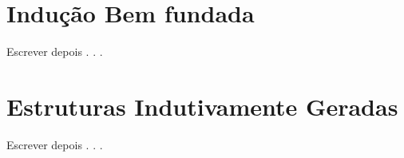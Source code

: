 \section{Indução Bem fundada}\label{sec:InducaoBoaOrdem}

Escrever depois . . . 

\section{Estruturas Indutivamente Geradas}\label{sec:InducaoEstrutural}

Escrever depois . . .
